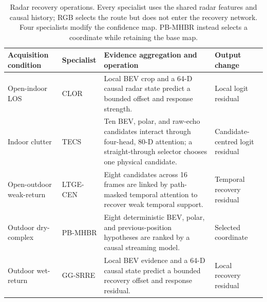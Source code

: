 \begin{table}[t]
\centering\small
\caption{Radar recovery operations. Every specialist uses the shared radar features and causal history; RGB selects the route but does not enter the recovery network. Four specialists modify the confidence map. PB-MHBR instead selects a coordinate while retaining the base map.}
\label{tab:expert-operations}
\begin{tabularx}{\textwidth}{@{}>{\raggedright\arraybackslash}p{}>{\raggedright\arraybackslash}p{}X>{\raggedright\arraybackslash}p{}@{}}
\toprule
Acquisition condition & Specialist & Evidence aggregation and operation & Output change\\
\midrule
Open-indoor LOS & CLOR & Local BEV crop and a 64-D causal radar state predict a bounded offset and response strength. & Local logit residual\\[3pt]
Indoor clutter & TECS & Ten BEV, polar, and raw-echo candidates interact through four-head, 80-D attention; a straight-through selector chooses one physical candidate. & Candidate-centred logit residual\\[3pt]
Open-outdoor weak-return & LTGE-CEN & Eight candidates across 16 frames are linked by path-masked temporal attention to recover weak temporal support. & Temporal recovery residual\\[3pt]
Outdoor dry-complex & PB-MHBR & Eight deterministic BEV, polar, and previous-position hypotheses are ranked by a causal streaming model. & Selected coordinate\\[3pt]
Outdoor wet-return & GG-SRRE & Local BEV evidence and a 64-D causal state predict a bounded recovery offset and response residual. & Local recovery residual\\
\bottomrule
\end{tabularx}
\end{table}
